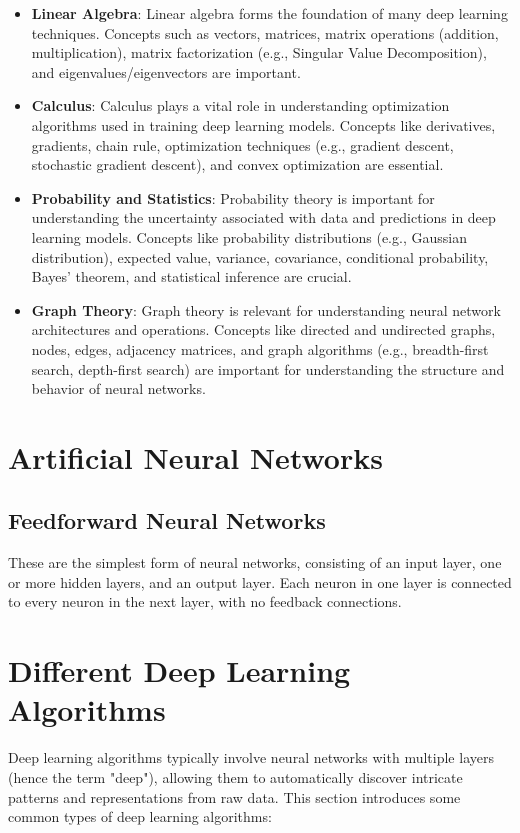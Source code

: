 \begin{itemize}
  \item \textbf{Linear Algebra}: Linear algebra forms the foundation of many deep learning techniques. Concepts such as vectors, matrices, matrix operations (addition, multiplication), matrix factorization (e.g., Singular Value Decomposition), and eigenvalues/eigenvectors are important.
  \item \textbf{Calculus}: Calculus plays a vital role in understanding optimization algorithms used in training deep learning models. Concepts like derivatives, gradients, chain rule, optimization techniques (e.g., gradient descent, stochastic gradient descent), and convex optimization are essential.
  \item \textbf{Probability and Statistics}: Probability theory is important for understanding the uncertainty associated with data and predictions in deep learning models. Concepts like probability distributions (e.g., Gaussian distribution), expected value, variance, covariance, conditional probability, Bayes' theorem, and statistical inference are crucial.
  \item \textbf{Graph Theory}: Graph theory is relevant for understanding neural network architectures and operations. Concepts like directed and undirected graphs, nodes, edges, adjacency matrices, and graph algorithms (e.g., breadth-first search, depth-first search) are important for understanding the structure and behavior of neural networks.
\end{itemize}

\section{Artificial Neural Networks}

\subsection{Feedforward Neural Networks}
These are the simplest form of neural networks, consisting of an input layer, one or more hidden layers, and an output layer. Each neuron in one layer is connected to every neuron in the next layer, with no feedback connections.

\section{Different Deep Learning Algorithms}

Deep learning algorithms typically involve neural networks with multiple layers (hence the term "deep"), allowing them to automatically discover intricate patterns and representations from raw data. This section introduces some common types of deep learning algorithms:

